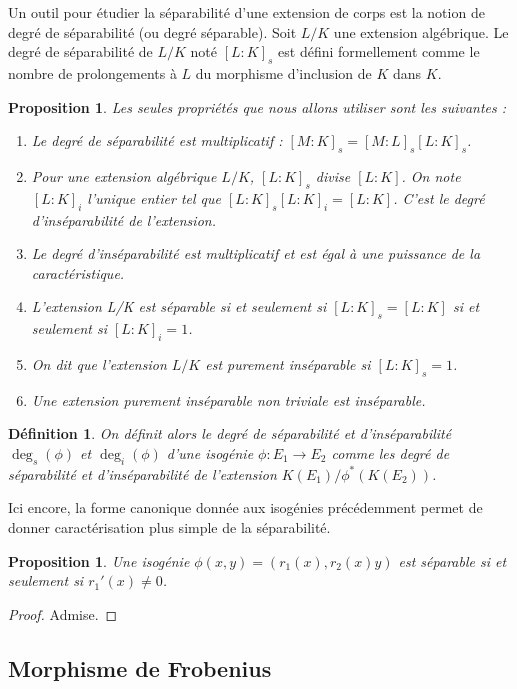 \documentclass{article}
\theoremstyle{plain}%
\newtheorem{prop}[thm]{Proposition}
\newtheorem{deff}[thm]{Définition}
\theoremstyle{definition}%
\begin{document}
Un outil pour étudier la séparabilité d’une extension de corps est la notion de degré de séparabilité (ou
degré séparable). Soit $L/K$ une extension algébrique. Le degré de séparabilité de $L/K$ noté  $[L : K]_s$ est défini
formellement comme le nombre de prolongements à $L$ du morphisme d’inclusion de $K$ dans $K$. 

\begin{prop}
Les seules
propriétés que nous allons utiliser sont les suivantes :
  \begin{enumerate}
    \item Le degré de séparabilité est multiplicatif : $[M : K]_s = [M : L]_s [L : K]_s$.
    \item Pour une extension algébrique $L/K$, $[L : K]_s$ divise $[L : K]$. On note $[L:K]_i$ l'unique entier tel que $[L:K]_s[L:K]_i=[L:K]$. C'est le degré d'inséparabilité de l'extension. 
    \item Le degré d'inséparabilité est multiplicatif et est égal à une puissance de la caractéristique.
    \item L’extension L/K est séparable si et seulement si $[L : K]_s = [L : K]$ si et seulement si $[L:K]_i = 1$.
    \item On dit que l'extension $L/K$ est purement inséparable si $[L:K]_s = 1$.
    \item Une extension purement inséparable non triviale est inséparable.
  \end{enumerate}
\end{prop}


\begin{deff}
On définit alors le degré de séparabilité et d'inséparabilité $\deg_s(\phi)$ et $\deg_i(\phi)$ d’une isogénie $\phi : E_1 \to E_2$ comme les degré de séparabilité et d'inséparabilité de l’extension $K(E_1)/\phi^*(K(E_2 ))$.
\end{deff}


Ici encore, la forme canonique donnée aux isogénies précédemment permet de donner caractérisation plus
simple de la séparabilité.

\begin{prop}
  \label{caracsep}
  Une isogénie $\phi(x, y) = (r_1(x), r_2(x)y)$ est séparable si et seulement si $r_1'(x) \neq 0$.
\end{prop}

\begin{proof}
  Admise.
\end{proof}

\subsection{Morphisme de Frobenius}
\end{document}
